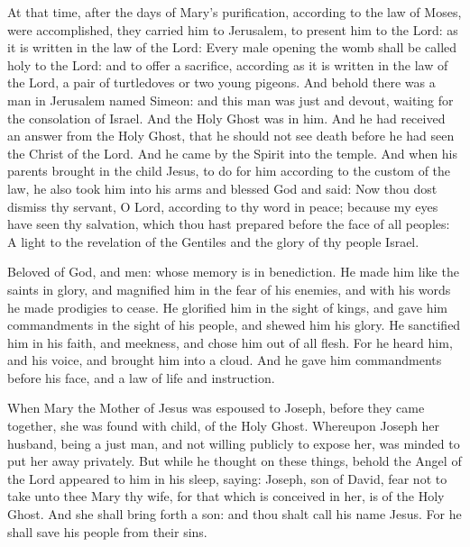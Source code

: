 
At that time,
after the days of Mary's purification, according to the law of
Moses, were accomplished, they carried him to Jerusalem, to present him
to the Lord:
as it is written in the law of the Lord: Every male opening the
womb shall be called holy to the Lord:
and to offer a sacrifice, according as it is written in the law of
the Lord, a pair of turtledoves or two young pigeons.
And behold there was a man in Jerusalem named Simeon: and this man
was just and devout, waiting for the consolation of Israel. And the Holy
Ghost was in him.
And he had received an answer from the Holy Ghost, that he should
not see death before he had seen the Christ of the Lord.
And he came by the Spirit into the temple. And when his parents
brought in the child Jesus, to do for him according to the custom of the
law,
he also took him into his arms and blessed God and said:
Now thou dost dismiss thy servant, O Lord, according to thy word
in peace;
because my eyes have seen thy salvation,
which thou hast prepared before the face of all peoples:
A light to the revelation of the Gentiles and the glory of thy
people Israel.





Beloved of God, and men: whose memory is in benediction.  He made him
like the saints in glory, and magnified him in the fear of his enemies, and
with his words he made prodigies to cease.  He glorified him in the sight of
kings, and gave him commandments in the sight of his people, and shewed him his
glory.  He sanctified him in his faith, and meekness, and chose him out of all
flesh.  For he heard him, and his voice, and brought him into a cloud.  And he
gave him commandments before his face, and a law of life and instruction.




When Mary the Mother of Jesus was
espoused to Joseph, before they came together, she was found with child, of the
Holy Ghost.  Whereupon Joseph her husband, being a just man, and not willing
publicly to expose her, was minded to put her away privately.  But while he
thought on these things, behold the Angel of the Lord appeared to him in his
sleep, saying: Joseph, son of David, fear not to take unto thee Mary thy wife,
for that which is conceived in her, is of the Holy Ghost.  And she shall bring
forth a son: and thou shalt call his name Jesus. For he shall save his people
from their sins.


